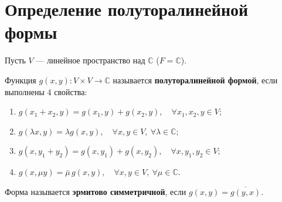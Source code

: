 \section{Определение полуторалинейной формы}

\begin{definition}
Пусть $V$ --- линейное пространство над $\mathbb{C}$ ($F = \mathbb{C}$).

Функция $g(x, y): V \times V \to \mathbb{C}$ называется \textbf{полуторалинейной формой}, если выполнены 4 свойства:
\begin{enumerate}
    \item $g(x_1 + x_2, y) = g(x_1, y) + g(x_2, y),\quad \forall x_1, x_2, y \in V$;
    \item $g(\lambda x, y) = \lambda g(x, y),\quad \forall x, y \in V,\ \forall \lambda \in \mathbb{C}$;
    \item $g(x, y_1 + y_2) = g(x, y_1) + g(x, y_2),\quad \forall x, y_1, y_2 \in V$;
    \item $g(x, \mu y) = \bar{\mu}\, g(x, y),\quad \forall x, y \in V,\ \forall \mu \in \mathbb{C}$.
\end{enumerate}

Форма называется \textbf{эрмитово симметричной}, если $g(x, y) = \overline{g(y, x)}$.
\end{definition}
